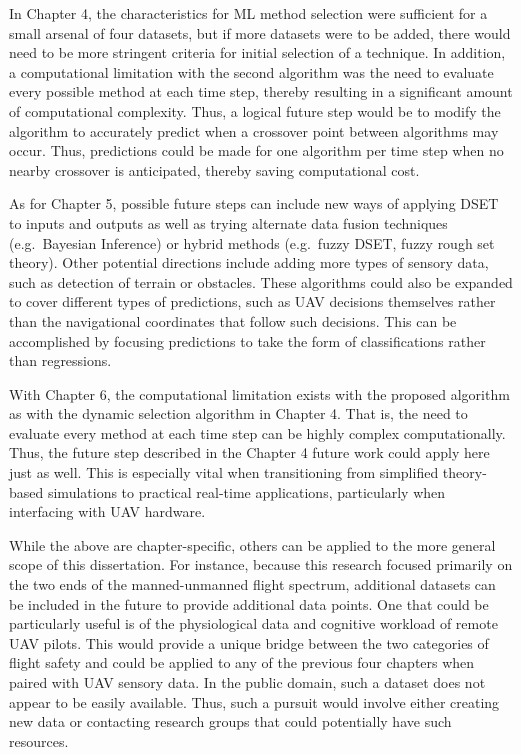 \documentclass[12pt]{uthesis-v12}  %
\begin{document}
In Chapter 4, the characteristics for ML method selection were sufficient for a small arsenal of four datasets, but if more datasets were to be added, there would need to be more stringent criteria for initial selection of a technique. In addition, a computational limitation with the second algorithm was the need to evaluate every possible method at each time step, thereby resulting in a significant amount of computational complexity. Thus, a logical future step would be to modify the algorithm to accurately predict when a crossover point between algorithms may occur. Thus, predictions could be made for one algorithm per time step when no nearby crossover is anticipated, thereby saving computational cost.

As for Chapter 5, possible future steps can include new ways of applying DSET to inputs and outputs as well as trying alternate data fusion techniques (e.g.~Bayesian Inference) or hybrid methods (e.g.~fuzzy DSET, fuzzy rough set theory). Other potential directions include adding more types of sensory data, such as detection of terrain or obstacles. These algorithms could also be expanded to cover different types of predictions, such as UAV decisions themselves rather than the navigational coordinates that follow such decisions. This can be accomplished by focusing predictions to take the form of classifications rather than regressions.

With Chapter 6, the computational limitation exists with the proposed algorithm as with the dynamic selection algorithm in Chapter 4. That is, the need to evaluate every method at each time step can be highly complex computationally. Thus, the future step described in the Chapter 4 future work could apply here just as well. This  is especially vital when transitioning from simplified theory-based simulations to practical real-time applications, particularly when interfacing with UAV hardware.

While the above are chapter-specific, others can be applied to the more general scope of this dissertation. For instance, because this research focused primarily on the two ends of the manned-unmanned flight spectrum, additional datasets can be included in the future to provide additional data points. One that could be particularly useful is of the physiological data and cognitive workload of remote UAV pilots. This would provide a unique bridge between the two categories of flight safety and could be applied to any of the previous four chapters when paired with UAV sensory data. In the public domain, such a dataset does not appear to be easily available. Thus, such a pursuit would involve either creating new data or contacting research groups that could potentially have such resources.
\end{document}
